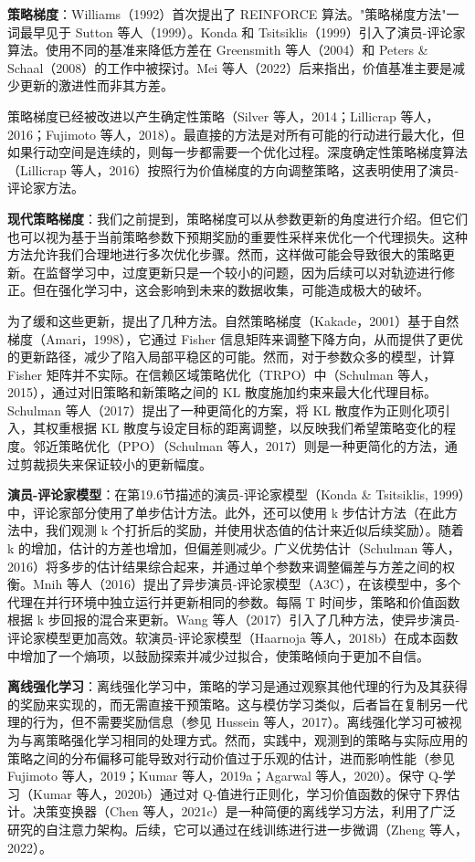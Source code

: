 \documentclass[lang=cn,newtx,10pt,scheme=chinese]{elegantbook}
\begin{document}
\textbf{策略梯度}：Williams（1992）首次提出了 REINFORCE 算法。"策略梯度方法"一词最早见于 Sutton 等人（1999）。Konda 和 Tsitsiklis（1999）引入了演员-评论家算法。使用不同的基准来降低方差在 Greensmith 等人（2004）和 Peters \& Schaal（2008）的工作中被探讨。Mei 等人（2022）后来指出，价值基准主要是减少更新的激进性而非其方差。

策略梯度已经被改进以产生确定性策略（Silver 等人，2014；Lillicrap 等人，2016；Fujimoto 等人，2018）。最直接的方法是对所有可能的行动进行最大化，但如果行动空间是连续的，则每一步都需要一个优化过程。深度确定性策略梯度算法（Lillicrap 等人，2016）按照行为价值梯度的方向调整策略，这表明使用了演员-评论家方法。

\textbf{现代策略梯度}：我们之前提到，策略梯度可以从参数更新的角度进行介绍。但它们也可以视为基于当前策略参数下预期奖励的重要性采样来优化一个代理损失。这种方法允许我们合理地进行多次优化步骤。然而，这样做可能会导致很大的策略更新。在监督学习中，过度更新只是一个较小的问题，因为后续可以对轨迹进行修正。但在强化学习中，这会影响到未来的数据收集，可能造成极大的破坏。

为了缓和这些更新，提出了几种方法。自然策略梯度（Kakade，2001）基于自然梯度（Amari，1998），它通过 Fisher 信息矩阵来调整下降方向，从而提供了更优的更新路径，减少了陷入局部平稳区的可能。然而，对于参数众多的模型，计算 Fisher 矩阵并不实际。在信赖区域策略优化（TRPO）中（Schulman 等人，2015），通过对旧策略和新策略之间的 KL 散度施加约束来最大化代理目标。Schulman 等人（2017）提出了一种更简化的方案，将 KL 散度作为正则化项引入，其权重根据 KL 散度与设定目标的距离调整，以反映我们希望策略变化的程度。邻近策略优化（PPO）（Schulman 等人，2017）则是一种更简化的方法，通过剪裁损失来保证较小的更新幅度。

\textbf{演员-评论家模型}：在第19.6节描述的演员-评论家模型（Konda \& Tsitsiklis, 1999）中，评论家部分使用了单步估计方法。此外，还可以使用 k 步估计方法（在此方法中，我们观测 k 个打折后的奖励，并使用状态值的估计来近似后续奖励）。随着 k 的增加，估计的方差也增加，但偏差则减少。广义优势估计（Schulman 等人，2016）将多步的估计结果综合起来，并通过单个参数来调整偏差与方差之间的权衡。Mnih 等人（2016）提出了异步演员-评论家模型（A3C），在该模型中，多个代理在并行环境中独立运行并更新相同的参数。每隔 T 时间步，策略和价值函数根据 k 步回报的混合来更新。Wang 等人（2017）引入了几种方法，使异步演员-评论家模型更加高效。软演员-评论家模型（Haarnoja 等人，2018b）在成本函数中增加了一个熵项，以鼓励探索并减少过拟合，使策略倾向于更加不自信。

\textbf{离线强化学习}：离线强化学习中，策略的学习是通过观察其他代理的行为及其获得的奖励来实现的，而无需直接干预策略。这与模仿学习类似，后者旨在复制另一代理的行为，但不需要奖励信息（参见 Hussein 等人，2017）。离线强化学习可被视为与离策略强化学习相同的处理方式。然而，实践中，观测到的策略与实际应用的策略之间的分布偏移可能导致对行动价值过于乐观的估计，进而影响性能（参见 Fujimoto 等人，2019；Kumar 等人，2019a；Agarwal 等人，2020）。保守 Q-学习（Kumar 等人，2020b）通过对 Q-值进行正则化，学习价值函数的保守下界估计。决策变换器（Chen 等人，2021c）是一种简便的离线学习方法，利用了广泛研究的自注意力架构。后续，它可以通过在线训练进行进一步微调（Zheng 等人，2022）。
\end{document}
